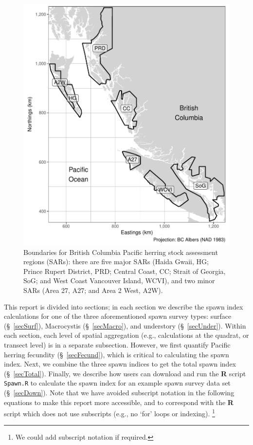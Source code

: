 \documentclass[12pt]{article}
\begin{document}
\begin{figure}
\centering
\includegraphics[width=\linewidth]{Figures/BC.pdf}
\caption[Boundaries for Pacific herring stock assessment regions (SARs)]
{Boundaries for British Columbia Pacific herring stock assessment regions (SARs): there are five major SARs (Haida Gwaii, HG; Prince Rupert District, PRD; Central Coast, CC; Strait of Georgia, SoG; and West Coast Vancouver Island, WCVI), and two minor SARs (Area 27, A27; and Area 2 West, A2W).}
\label{figBC}
\end{figure}

This report is divided into sections; in each section we describe the spawn index calculations for one of the three aforementioned spawn survey types: surface (\S~\ref{secSurf}), Macrocystis (\S~\ref{secMacro}), and understory (\S~\ref{secUnder}).
Within each section, each level of spatial aggregation (e.g., calculations at the quadrat, or transect level) is in a separate subsection.
However, we first quantify Pacific herring fecundity (\S~\ref{secFecund}), which is critical to calculating the spawn index.
Next, we combine the three spawn indices to get the total spawn index (\S~\ref{secTotal}).
Finally, we describe how users can download and run the \textbf{R} script \texttt{Spawn.R} to calculate the spawn index for an example spawn survey data set (\S~\ref{secDown}).
Note that we have avoided subscript notation in the following equations to make this report more accessible, and to correspond with the \textbf{R} script which does not use subscripts (e.g., no `for' loops or indexing).%
\footnote{We could add subscript notation if required.}
\end{document}
